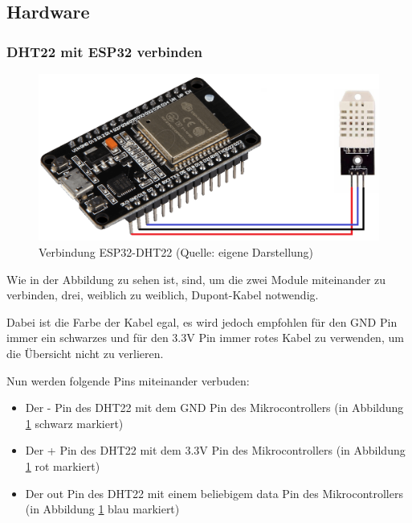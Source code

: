 \subsection{Hardware}

\subsubsection{DHT22 mit ESP32 verbinden}
\begin{figure}[H]
    \begin{center}
        \includegraphics[scale=0.36]{images/DHT22-ESP32-Connection.png}
        \caption{Verbindung ESP32-DHT22 (Quelle: eigene Darstellung)}
        \label{abb:esp32-dht22}
    \end{center}
\end{figure}


Wie in der Abbildung zu sehen ist, sind, um die zwei Module miteinander zu verbinden, drei, weiblich zu weiblich, Dupont-Kabel notwendig.

Dabei ist die Farbe der Kabel egal, es wird jedoch empfohlen für den GND Pin immer ein schwarzes und für den 3.3V Pin immer rotes Kabel zu verwenden, um die Übersicht nicht zu verlieren.

Nun werden folgende Pins miteinander verbuden:
\begin{itemize}
    \item Der - Pin des DHT22 mit dem GND Pin des Mikrocontrollers (in Abbildung \ref{abb:esp32-dht22} schwarz markiert)
    \item Der + Pin des DHT22 mit dem 3.3V Pin des Mikrocontrollers (in Abbildung \ref{abb:esp32-dht22} rot markiert)
    \item Der out Pin des DHT22 mit einem beliebigem data Pin des Mikrocontrollers (in Abbildung \ref{abb:esp32-dht22} blau markiert)
\end{itemize}
\pagebreak


